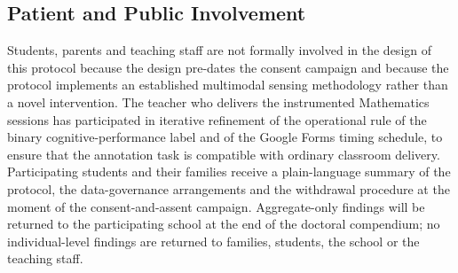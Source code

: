 \subsection{Patient and Public Involvement}\label{subsec:ppi}

Students, parents and teaching staff are not formally involved in the design of this protocol because the design pre-dates the consent campaign and because the protocol implements an established multimodal sensing methodology rather than a novel intervention. The teacher who delivers the instrumented Mathematics sessions has participated in iterative refinement of the operational rule of the binary cognitive-performance label and of the Google Forms timing schedule, to ensure that the annotation task is compatible with ordinary classroom delivery. Participating students and their families receive a plain-language summary of the protocol, the data-governance arrangements and the withdrawal procedure at the moment of the consent-and-assent campaign. Aggregate-only findings will be returned to the participating school at the end of the doctoral compendium; no individual-level findings are returned to families, students, the school or the teaching staff.
